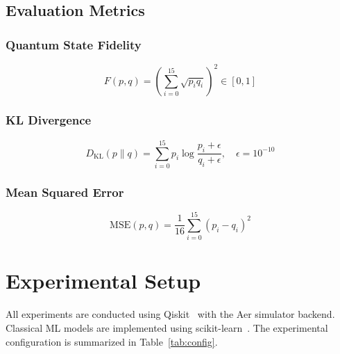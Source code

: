 \documentclass[journal]{IEEEtran}
\begin{document}
\subsection{Evaluation Metrics}

\subsubsection{Quantum State Fidelity}
\begin{equation}
  F(p, q) = \left(\sum_{i=0}^{15} \sqrt{p_i q_i}\right)^2 \in [0,1]
\end{equation}

\subsubsection{KL Divergence}
\begin{equation}
  D_{\text{KL}}(p \| q) = \sum_{i=0}^{15} p_i \log \frac{p_i + \epsilon}{q_i + \epsilon}, \quad \epsilon = 10^{-10}
\end{equation}

\subsubsection{Mean Squared Error}
\begin{equation}
  \text{MSE}(p, q) = \frac{1}{16}\sum_{i=0}^{15}(p_i - q_i)^2
\end{equation}

\section{Experimental Setup}

All experiments are conducted using Qiskit~\cite{qiskit2023} with the Aer simulator backend. Classical ML models are implemented using scikit-learn~\cite{pedregosa2011}. The experimental configuration is summarized in Table~\ref{tab:config}.
\end{document}
